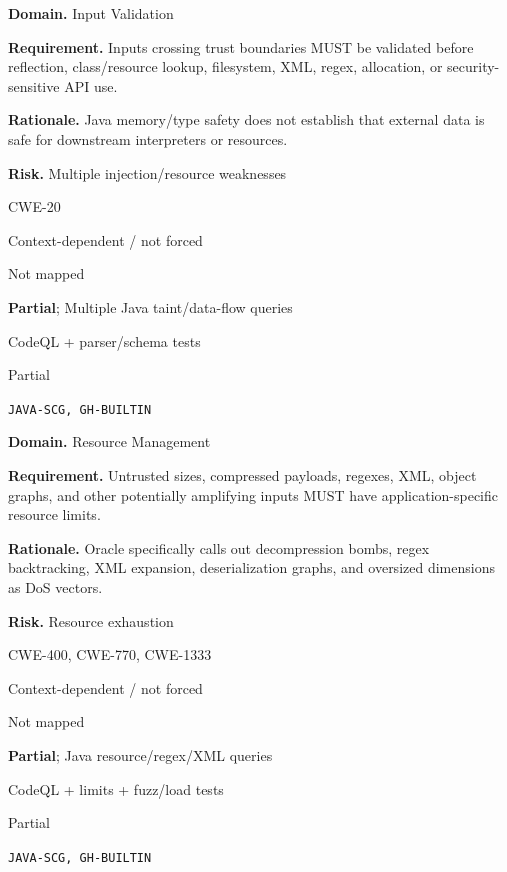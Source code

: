 \documentclass[10pt,letterpaper]{article}
\newcommand{\prioritybadge}[2]{\tcbox[on line,boxrule=0pt,arc=1.2mm,boxsep=0.7mm,left=1mm,right=1mm,top=0.4mm,bottom=0.4mm,colback=#2!12,coltext=#2]{\scriptsize\bfseries #1}}
\begin{document}
\begin{rulebox}[title={\texttt{SCS-JAVA-INPUT-001} \hfill \prioritybadge{High Priority}{High}}]
\textbf{Domain.} Input Validation

\textbf{Requirement.} Inputs crossing trust boundaries MUST be validated before reflection, class/resource lookup, filesystem, XML, regex, allocation, or security-sensitive API use.

\textbf{Rationale.} Java memory/type safety does not establish that external data is safe for downstream interpreters or resources.

\textbf{Risk.} Multiple injection/resource weaknesses

\begin{description}[leftmargin=2.65cm,labelwidth=2.3cm,style=nextline,itemsep=1pt,topsep=3pt]
  \item[CWE] CWE-20
  \item[OWASP] Context-dependent / not forced
  \item[CERT] Not mapped
  \item[CodeQL] \textbf{Partial}; Multiple Java taint/data-flow queries
  \item[Enforcement] CodeQL + parser/schema tests
  \item[Automation] Partial
  \item[Sources] \texttt{JAVA-SCG, GH-BUILTIN}
\end{description}
\end{rulebox}

\begin{rulebox}[title={\texttt{SCS-JAVA-RESOURCE-001} \hfill \prioritybadge{High Priority}{High}}]
\textbf{Domain.} Resource Management

\textbf{Requirement.} Untrusted sizes, compressed payloads, regexes, XML, object graphs, and other potentially amplifying inputs MUST have application-specific resource limits.

\textbf{Rationale.} Oracle specifically calls out decompression bombs, regex backtracking, XML expansion, deserialization graphs, and oversized dimensions as DoS vectors.

\textbf{Risk.} Resource exhaustion

\begin{description}[leftmargin=2.65cm,labelwidth=2.3cm,style=nextline,itemsep=1pt,topsep=3pt]
  \item[CWE] CWE-400, CWE-770, CWE-1333
  \item[OWASP] Context-dependent / not forced
  \item[CERT] Not mapped
  \item[CodeQL] \textbf{Partial}; Java resource/regex/XML queries
  \item[Enforcement] CodeQL + limits + fuzz/load tests
  \item[Automation] Partial
  \item[Sources] \texttt{JAVA-SCG, GH-BUILTIN}
\end{description}
\end{rulebox}
\end{document}
